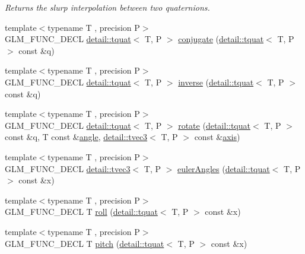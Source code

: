\begin{DoxyCompactItemize}
\begin{DoxyCompactList}\small\item\em Returns the slurp interpolation between two quaternions. \end{DoxyCompactList}\item 
{\footnotesize template$<$typename T , precision P$>$ }\\G\-L\-M\-\_\-\-F\-U\-N\-C\-\_\-\-D\-E\-C\-L \hyperlink{structglm_1_1detail_1_1tquat}{detail\-::tquat}$<$ T, P $>$ \hyperlink{group__gtc__quaternion_gaf78006c47276b151777fc194cf11a688}{conjugate} (\hyperlink{structglm_1_1detail_1_1tquat}{detail\-::tquat}$<$ T, P $>$ const \&q)
\item 
{\footnotesize template$<$typename T , precision P$>$ }\\G\-L\-M\-\_\-\-F\-U\-N\-C\-\_\-\-D\-E\-C\-L \hyperlink{structglm_1_1detail_1_1tquat}{detail\-::tquat}$<$ T, P $>$ \hyperlink{group__gtc__quaternion_ga6613ef61cb980a18f19ece5f421564da}{inverse} (\hyperlink{structglm_1_1detail_1_1tquat}{detail\-::tquat}$<$ T, P $>$ const \&q)
\item 
{\footnotesize template$<$typename T , precision P$>$ }\\G\-L\-M\-\_\-\-F\-U\-N\-C\-\_\-\-D\-E\-C\-L \hyperlink{structglm_1_1detail_1_1tquat}{detail\-::tquat}$<$ T, P $>$ \hyperlink{group__gtc__quaternion_gaa9a8891f03d8f5373525c4b3159c1c73}{rotate} (\hyperlink{structglm_1_1detail_1_1tquat}{detail\-::tquat}$<$ T, P $>$ const \&q, T const \&\hyperlink{group__gtc__quaternion_ga23a3fc7ada5bbb665ff84c92c6e0542c}{angle}, \hyperlink{structglm_1_1detail_1_1tvec3}{detail\-::tvec3}$<$ T, P $>$ const \&\hyperlink{group__gtc__quaternion_ga8eef9f8c3f2e4836dccf09df975b20fb}{axis})
\item 
{\footnotesize template$<$typename T , precision P$>$ }\\G\-L\-M\-\_\-\-F\-U\-N\-C\-\_\-\-D\-E\-C\-L \hyperlink{structglm_1_1detail_1_1tvec3}{detail\-::tvec3}$<$ T, P $>$ \hyperlink{group__gtc__quaternion_gade4034f49ccadf63cb31a7fb5fa3c8aa}{euler\-Angles} (\hyperlink{structglm_1_1detail_1_1tquat}{detail\-::tquat}$<$ T, P $>$ const \&x)
\item 
{\footnotesize template$<$typename T , precision P$>$ }\\G\-L\-M\-\_\-\-F\-U\-N\-C\-\_\-\-D\-E\-C\-L T \hyperlink{group__gtc__quaternion_ga6d883e423bc425f4334fcce202131f7e}{roll} (\hyperlink{structglm_1_1detail_1_1tquat}{detail\-::tquat}$<$ T, P $>$ const \&x)
\item 
{\footnotesize template$<$typename T , precision P$>$ }\\G\-L\-M\-\_\-\-F\-U\-N\-C\-\_\-\-D\-E\-C\-L T \hyperlink{group__gtc__quaternion_ga4d345dc369a54f53f5ebc375bac56d11}{pitch} (\hyperlink{structglm_1_1detail_1_1tquat}{detail\-::tquat}$<$ T, P $>$ const \&x)

\end{DoxyCompactItemize}
